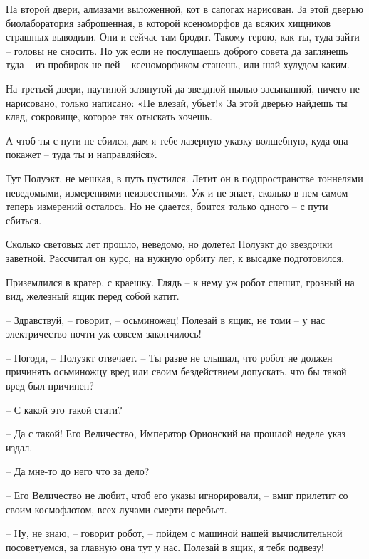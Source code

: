 \documentclass[ebook,oneside,final,openright]{memoir}
\begin{document}
На второй двери, алмазами выложенной, кот в сапогах нарисован. За этой дверью биолаборатория заброшенная, в которой ксеноморфов да всяких хищников страшных выводили. Они и сейчас там бродят. Такому герою, как ты, туда зайти – головы не сносить. Но уж если не послушаешь доброго совета да заглянешь туда – из пробирок не пей – ксеноморфиком станешь, или шай-хулудом каким.\par
\par
На третьей двери, паутиной затянутой да звездной пылью засыпанной, ничего не нарисовано, только написано: «Не влезай, убьет!» За этой дверью найдешь ты клад, сокровище, которое так отыскать хочешь.\par
\par
А чтоб ты с пути не сбился, дам я тебе лазерную указку волшебную, куда она покажет – туда ты и направляйся».\par
\par
Тут Полуэкт, не мешкая, в путь пустился. Летит он в подпространстве тоннелями неведомыми, измерениями неизвестными. Уж и не знает, сколько в нем самом теперь измерений осталось. Но не сдается, боится только одного – с пути сбиться.\par
\par
Сколько световых лет прошло, неведомо, но долетел Полуэкт до звездочки заветной. Рассчитал он курс, на нужную орбиту лег, к высадке подготовился.\par
\par
Приземлился в кратер, с краешку. Глядь – к нему уж робот спешит, грозный на вид, железный ящик перед собой катит.\par
– Здравствуй, – говорит, – осьминожец! Полезай в ящик, не томи – у нас электричество почти уж совсем закончилось!\par
– Погоди, – Полуэкт отвечает. – Ты разве не слышал, что робот не должен причинять осьминожцу вред или своим бездействием допускать, что бы такой вред был причинен?\par
– С какой это такой стати?\par
– Да с такой! Его Величество, Император Орионский на прошлой неделе указ издал.\par
– Да мне-то до него что за дело?\par
– Его Величество не любит, чтоб его указы игнорировали, – вмиг прилетит со своим космофлотом, всех лучами смерти перебьет.\par
– Ну, не знаю, – говорит робот, – пойдем с машиной нашей вычислительной посоветуемся, за главную она тут у нас. Полезай в ящик, я тебя подвезу!\par
\end{document}
